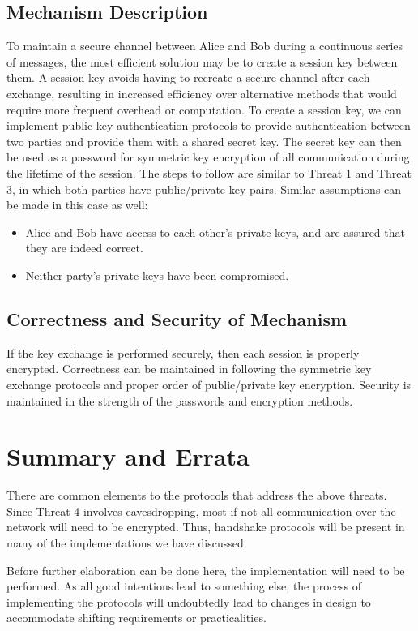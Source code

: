 \documentclass[11pt]{article}
\begin{document}
\subsection{Mechanism Description}
To maintain a secure channel between Alice and Bob during a continuous series of messages, the most efficient solution may be to create a session key between them. A session key avoids having to recreate a secure channel after each exchange, resulting in increased efficiency over alternative methods that would require more frequent overhead or computation. To create a session key, we can implement public-key authentication protocols to provide authentication between two parties and provide them with a shared secret key. The secret key can then be used as a password for symmetric key encryption of all communication during the lifetime of the session. The steps to follow are similar to Threat 1 and Threat 3, in which both parties have public/private key pairs. Similar assumptions can be made in this case as well:
\begin{itemize}
\item{}Alice and Bob have access to each other's private keys, and are assured that they are indeed correct.
\item{}Neither party's private keys have been compromised.
\end{itemize}
\subsection{Correctness and Security of Mechanism}
If the key exchange is performed securely, then each session is properly encrypted. Correctness can be maintained in following the symmetric key exchange protocols and proper order of public/private key encryption. Security is maintained in the strength of the passwords and encryption methods.
\section{Summary and Errata}
There are common elements to the protocols that address the above threats. Since Threat 4 involves eavesdropping, most if not all communication over the network will need to be encrypted. Thus, handshake protocols will be present in many of the implementations we have discussed.

Before further elaboration can be done here, the implementation will need to be performed. As all good intentions lead to something else, the process of implementing the protocols will undoubtedly lead to changes in design to accommodate shifting requirements or practicalities.
\end{document}
